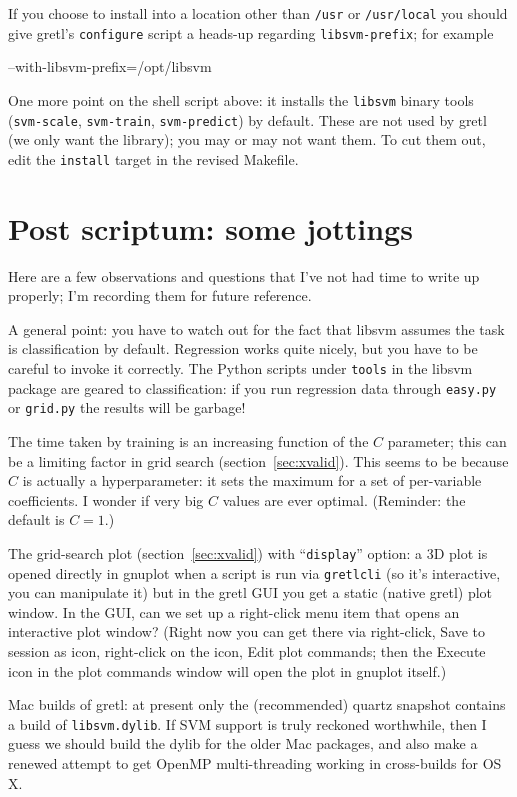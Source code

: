 \documentclass{article}
\begin{document}
If you choose to install into a location other than \texttt{/usr} or
\texttt{/usr/local} you should give gretl's \texttt{configure} script
a heads-up regarding \texttt{libsvm-prefix}; for example
\begin{code}
--with-libsvm-prefix=/opt/libsvm
\end{code}

One more point on the shell script above: it installs the
\texttt{libsvm} binary tools (\texttt{svm-scale}, \texttt{svm-train},
\texttt{svm-predict}) by default. These are not used by gretl (we only
want the library); you may or may not want them. To cut them out, edit
the \texttt{install} target in the revised Makefile.




\section*{Post scriptum: some jottings}

Here are a few observations and questions that I've not had time to
write up properly; I'm recording them for future reference.

A general point: you have to watch out for the fact that
\textsf{libsvm} assumes the task is classification by
default. Regression works quite nicely, but you have to be careful to
invoke it correctly. The Python scripts under \texttt{tools} in the
\textsf{libsvm} package are geared to classification: if you run
regression data through \texttt{easy.py} or \texttt{grid.py} the
results will be garbage!

The time taken by training is an increasing function of the $C$
parameter; this can be a limiting factor in grid search
(section~\ref{sec:xvalid}). This seems to be because $C$ is actually a
hyperparameter: it sets the maximum for a set of per-variable
coefficients. I wonder if very big $C$ values are ever
optimal. (Reminder: the default is $C=1$.)

The grid-search plot (section~\ref{sec:xvalid}) with
``\texttt{display}'' option: a 3D plot is opened directly in
\textsf{gnuplot} when a script is run via \texttt{gretlcli} (so it's
interactive, you can manipulate it) but in the gretl GUI you get a
static (native gretl) plot window. In the GUI, can we set up a
right-click menu item that opens an interactive plot window? (Right
now you can get there via right-click, Save to session as icon,
right-click on the icon, Edit plot commands; then the Execute icon in
the plot commands window will open the plot in \textsf{gnuplot}
itself.)

Mac builds of gretl: at present only the (recommended) quartz snapshot
contains a build of \texttt{libsvm.dylib}.  If SVM support is truly
reckoned worthwhile, then I guess we should build the dylib for the
older Mac packages, and also make a renewed attempt to get
\textsf{OpenMP} multi-threading working in cross-builds for OS X.
\end{document}
